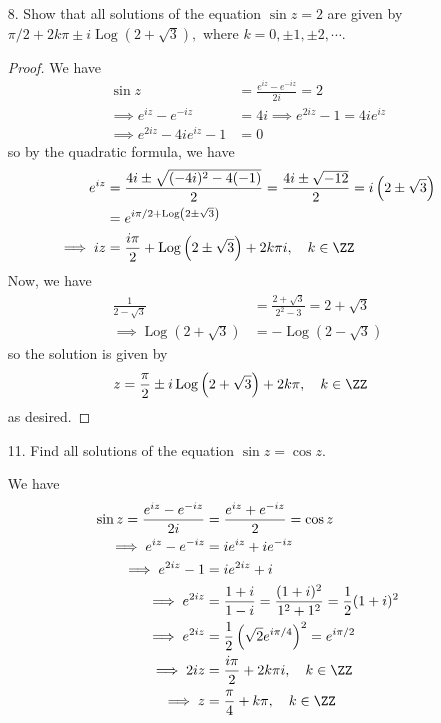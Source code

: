 \documentclass{article}
\DeclareMathOperator{\Log}{Log}
\begin{document}
\begin{itemize}
	\item[8.] Show that all solutions of the equation $\sin z=2$ are given by $\pi/2 + 2k\pi \pm i\Log(2+\sqrt{3}),$ where $k=0, \pm 1, \pm 2, \cdots.$
		\begin{proof}
			We have
			\begin{align*}
				\sin z &= \frac{e^{iz}-e^{-iz}}{2i} = 2 \\
				\implies e^{iz} - e^{-iz} &= 4i \implies e^{2iz} - 1 = 4ie^{iz} \\
				\implies e^{2iz} - 4ie^{iz} - 1 &= 0
			\end{align*}
			so by the quadratic formula, we have
			\begin{align*}
				e^{iz} &= \frac{4i \pm \sqrt{(-4i)^2 - 4(-1)}}{2} = \frac{4i \pm \sqrt{-12}}{2} =i\left( 2 \pm \sqrt{3}\right) \\
				&= e^{i\pi/2+\Log\left( 2\pm \sqrt{3} \right)}\\
				\implies iz &= \frac{i\pi}{2} + \Log\left( 2\pm \sqrt{3} \right) + 2k\pi i, \quad k\in\ZZ
			\end{align*}
			Now, we have
			\begin{align*}
				\frac{1}{2-\sqrt{3}} &= \frac{2+\sqrt{3}}{2^2-3} = 2+\sqrt{3} \\
				\implies \Log\left( 2+\sqrt{3} \right) &= -\Log\left( 2-\sqrt{3} \right)
			\end{align*}
			so the solution is given by
			\begin{align*}
				z &= \frac{\pi}{2} \pm i\Log\left( 2+\sqrt{3} \right) + 2k\pi, \quad k\in\ZZ
			\end{align*}
			as desired.
		\end{proof}

	\item[11.] Find all solutions of the equation $\sin z = \cos z.$
		\begin{soln}
			We have
			\begin{align*}
				\sin z = \frac{e^{iz}-e^{-iz}}{2i} &= \frac{e^{iz} + e^{-iz}}{2} = \cos z \\
				\implies e^{iz} - e^{-iz} &= ie^{iz} + ie^{-iz} \\
				\implies e^{2iz} - 1 &= ie^{2iz} + i \\
				\implies e^{2iz} &= \frac{1+i}{1-i} = \frac{(1+i)^2}{1^2+1^2} = \frac{1}{2}(1+i)^2 \\
				\implies e^{2iz} &= \frac{1}{2} \left( \sqrt{2}e^{i\pi/4} \right)^2 = e^{i\pi/2} \\
				\implies 2iz &= \frac{i\pi}{2} + 2k\pi i, \quad k\in\ZZ \\
				\implies z &= \frac{\pi}{4} + k\pi, \quad k\in\ZZ
			\end{align*}
		\end{soln}

\end{itemize}
\end{document}

